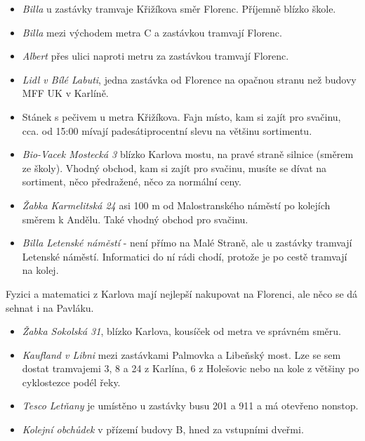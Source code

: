\begin{itemize}
\item \textit{Billa} u zastávky tramvaje Křižíkova směr Florenc. Příjemně blízko
škole.
\item \textit{Billa} mezi východem metra C a zastávkou tramvají Florenc.
\item \textit{Albert} přes ulici naproti metru za zastávkou tramvají Florenc.
\item \textit{Lidl v Bílé Labuti}, jedna zastávka od Florence na opačnou stranu
než budovy MFF UK v Karlíně.
\item Stánek s pečivem u metra Křižíkova. Fajn místo, kam si zajít pro svačinu,
cca. od 15:00 mívají padesátiprocentní slevu na většinu sortimentu.
\end{itemize}

\begin{itemize}
\item \textit{Bio-Vacek Mostecká 3} blízko Karlova mostu, na pravé straně
silnice (směrem ze školy). Vhodný obchod, kam si zajít pro svačinu, musíte se
dívat na sortiment, něco předražené, něco za normální ceny.
\item \textit{Žabka Karmelitská 24} asi 100 m od Malostranského náměstí po
kolejích směrem k Andělu. Také vhodný obchod pro svačinu.
\item \textit{Billa Letenské náměstí} - není přímo na Malé Straně, ale u
zastávky tramvají Letenské náměstí. Informatici do ní rádi chodí, protože je po
cestě tramvají na kolej.
\end{itemize}

Fyzici a matematici z Karlova mají nejlepší nakupovat na Florenci, ale něco se
dá sehnat i na Pavláku.
\begin{itemize}
\item \textit{Žabka Sokolská 31}, blízko Karlova, kousíček od metra ve správném
směru.
\end{itemize}

\begin{itemize}
\item \textit{Kaufland v Libni} mezi zastávkami Palmovka a Libeňský most. Lze se
sem dostat tramvajemi 3, 8 a 24 z Karlína, 6 z Holešovic nebo na kole z většiny
po cyklostezce podél řeky.
\item \textit{Tesco Letňany} je umístěno u zastávky busu 201 a 911 a má otevřeno
nonstop.
\item \textit{Kolejní obchůdek} v přízemí budovy B, hned za vstupními dveřmi.
\end{itemize}

